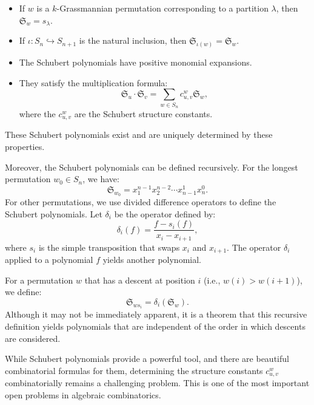 \begin{itemize}
    \item If \(w\) is a \(k\)-Grassmannian permutation corresponding to a partition \(\lambda\), then \(\mathfrak{S}_w = s_\lambda\).
    \item If \(\iota: S_n \hookrightarrow S_{n+1}\) is the natural inclusion, then \(\mathfrak{S}_{\iota(w)} = \mathfrak{S}_w\).
    \item The Schubert polynomials have positive monomial expansions.
    \item They satisfy the multiplication formula:
    \begin{equation}
        \mathfrak{S}_u \cdot \mathfrak{S}_v = \sum_{w \in S_n} c_{u,v}^w \mathfrak{S}_w,
    \end{equation}
    where the \(c_{u,v}^w\) are the Schubert structure constants.
\end{itemize}

These Schubert polynomials exist and are uniquely determined by these properties.

Moreover, the Schubert polynomials can be defined recursively. For the longest permutation \(w_0 \in S_n\), we have:
\begin{equation}
    \mathfrak{S}_{w_0} = x_1^{n-1} x_2^{n-2} \cdots x_{n-1}^1 x_n^0.
\end{equation}
For other permutations, we use divided difference operators to define the Schubert polynomials. Let \(\delta_i\) be the operator defined by:
\begin{equation}
    \delta_i(f) = \frac{f - s_i(f)}{x_i - x_{i+1}},
\end{equation}
where \(s_i\) is the simple transposition that swaps \(x_i\) and \(x_{i+1}\). The operator \(\delta_i\) applied to a polynomial \(f\) yields another polynomial.

For a permutation \(w\) that has a descent at position \(i\) (i.e., \(w(i) > w(i+1)\)), we define:
\begin{equation}
    \mathfrak{S}_{ws_i} = \delta_i(\mathfrak{S}_w).
\end{equation}
Although it may not be immediately apparent, it is a theorem that this recursive definition yields polynomials that are independent of the order in which descents are considered.

While Schubert polynomials provide a powerful tool,
and there are beautiful combinatorial formulas for them,
determining the structure constants \(c_{u,v}^w\) combinatorially remains a challenging problem.
This is one of the most important open problems in algebraic combinatorics.

